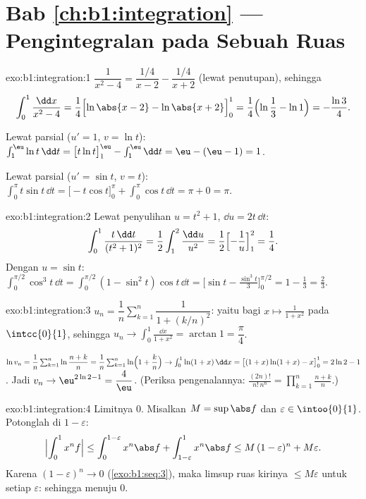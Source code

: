 \section*{Bab \ref{ch:b1:integration} --- Pengintegralan pada Sebuah Ruas}

\begin{solution}{exo:b1:integration:1}
$\dfrac{1}{x^2-4} = \dfrac{1/4}{x - 2} - \dfrac{1/4}{x+2}$
(lewat penutupan), sehingga
\[
\int_0^1 \frac{\dd x}{x^2 - 4}
= \frac14\Bigl[\ln\abs{x-2} - \ln\abs{x+2}\Bigr]_0^1
= \frac14\Bigl(\ln\frac{1}{3} - \ln 1\Bigr) = -\frac{\ln 3}{4}.
\]

Lewat parsial ($u' = 1$, $v = \ln t$): $\int_1^{\eu} \ln t\,\dd t =
\bigl[t\ln t\bigr]_1^{\eu} - \int_1^{\eu} \dd t = \eu - (\eu - 1) =
1$.

Lewat parsial ($u' = \sin t$, $v = t$): $\int_0^\pi t\sin t\,\dd t =
\bigl[-t\cos t\bigr]_0^\pi + \int_0^\pi \cos t\,\dd t = \pi + 0 =
\pi$.
\end{solution}

\begin{solution}{exo:b1:integration:2}
Lewat penyulihan $u = t^2 + 1$, $\dd u = 2t\,\dd t$:
\[
\int_0^1 \frac{t\,\dd t}{(t^2+1)^2}
= \frac12 \int_1^2 \frac{\dd u}{u^2}
= \frac12\Bigl[-\frac1u\Bigr]_1^2 = \frac14 .
\]
Dengan $u = \sin t$: $\int_0^{\pi/2} \cos^3 t\,\dd t = \int_0^{\pi/2}
(1 - \sin^2 t)\cos t\,\dd t = \bigl[\sin t - \frac{\sin^3
t}{3}\bigr]_0^{\pi/2} = 1 - \frac13 = \frac23$.
\end{solution}

\begin{solution}{exo:b1:integration:3}
$u_n = \dfrac1n \sum_{k=1}^{n} \dfrac{1}{1 + (k/n)^2}$: yaitu 
bagi $x \mapsto \frac{1}{1+x^2}$ pada $\intcc{0}{1}$, sehingga $u_n \to
\int_0^1 \frac{\dd x}{1+x^2} = \arctan 1 = \dfrac\pi4$.

$\ln v_n = \dfrac1n \sum_{k=1}^{n} \ln\dfrac{n+k}{n} = \dfrac 1n
\sum_{k=1}^n \ln\Bigl(1 + \dfrac kn\Bigr) \to \int_0^1 \ln(1+x)\,\dd
x = \bigl[(1+x)\ln(1+x) - x\bigr]_0^1 = 2\ln 2 - 1$. Jadi $v_n \to
\eu^{2\ln 2 - 1} = \dfrac 4\eu$. (Periksa pengenalannya:
$\frac{(2n)!}{n!\,n^n} = \prod_{k=1}^{n} \frac{n+k}{n}$.)
\end{solution}

\begin{solution}{exo:b1:integration:4}
Limitnya $0$. Misalkan $M = \sup \abs f$ dan $\varepsilon \in
\intoo{0}{1}$. Potonglah di $1 - \varepsilon$:
\[
\Bigl| \int_0^1 x^n f \Bigr|
\leq \int_0^{1 - \varepsilon} x^n \abs f + \int_{1-\varepsilon}^1
x^n \abs f
\leq M\,(1-\varepsilon)^n + M\varepsilon .
\]
Karena $(1 - \varepsilon)^n \to 0$ (\cref{exo:b1:seq:3}), maka limsup
ruas kirinya $\leq M\varepsilon$ untuk setiap $\varepsilon$:
sehingga  menuju $0$.
\end{solution}

